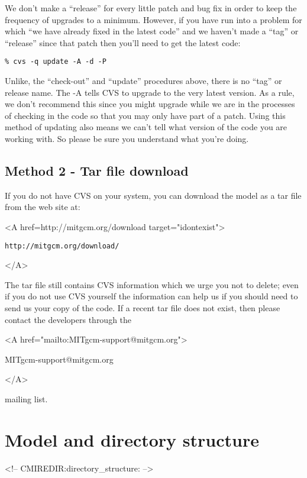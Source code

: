 We don't make a ``release'' for every little patch and bug fix in
order to keep the frequency of upgrades to a minimum. However, if you
have run into a problem for which ``we have already fixed in the
latest code'' and we haven't made a ``tag'' or ``release'' since that
patch then you'll need to get the latest code:
\begin{verbatim}
% cvs -q update -A -d -P
\end{verbatim}
Unlike, the ``check-out'' and ``update'' procedures above, there is no
``tag'' or release name. The -A tells CVS to upgrade to the
very latest version. As a rule, we don't recommend this since you
might upgrade while we are in the processes of checking in the code so
that you may only have part of a patch. Using this method of updating
also means we can't tell what version of the code you are working
with. So please be sure you understand what you're doing.

\subsection{Method 2 - Tar file download}
\label{sect:conventionalDownload}

If you do not have CVS on your system, you can download the model as a
tar file from the web site at:
\begin{rawhtml} <A href=http://mitgcm.org/download target="idontexist"> \end{rawhtml}
\begin{verbatim}
http://mitgcm.org/download/
\end{verbatim}
\begin{rawhtml} </A> \end{rawhtml}
The tar file still contains CVS information which we urge you not to
delete; even if you do not use CVS yourself the information can help
us if you should need to send us your copy of the code.  If a recent
tar file does not exist, then please contact the developers through
the 
\begin{rawhtml} <A href="mailto:MITgcm-support@mitgcm.org"> \end{rawhtml}
MITgcm-support@mitgcm.org
\begin{rawhtml} </A> \end{rawhtml}
mailing list.

\section{Model and directory structure}
\begin{rawhtml}
<!-- CMIREDIR:directory_structure: -->
\end{rawhtml}

